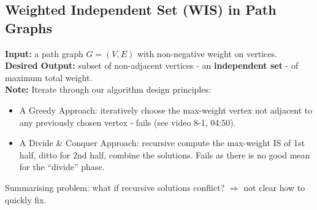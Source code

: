 \documentclass{scrartcl}
\begin{document}
\subsection{Weighted Independent Set (WIS) in Path Graphs}
\label{sec:8-1-1}
{\bf Input: } a path graph $G=(V, E)$ with non-negative weight on vertices.\\
{\bf Desired Output: } subset of non-adjacent vertices - an {\bf independent set
} - of maximum total weight.\\
{\bf Note: } Iterate through our algorithm design principles:
\begin{itemize}
\item A Greedy Approach: iteratively choose the max-weight vertex not adjacent
  to any previously chosen vertex - fails (see video 8-1, 04:50).
\item A Divide \& Conquer Approach: recursive compute the max-weight IS of 1st
  half, ditto for 2nd half, combine the solutions. Fails as there is no good
  mean for the ``divide'' phase.
\end{itemize}
Summarising problem: what if recursive solutions conflict? $\Rightarrow $ not clear how to quickly fix.

\end{document}
